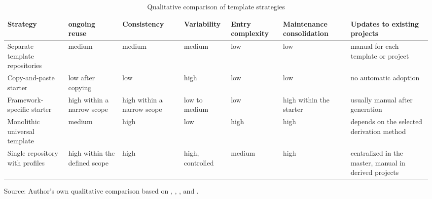 \begin{table}[htbp]
  \centering
  \scriptsize
  \setlength{\tabcolsep}{3pt}
  \renewcommand{\arraystretch}{1.08}
  \caption{Qualitative comparison of template strategies}
  \label{tab:template-strategy-comparison}
  \begin{tabularx}{\textwidth}{@{}>{\raggedright\arraybackslash}p{}>{\centering\arraybackslash}p{}>{\centering\arraybackslash}p{}>{\centering\arraybackslash}p{}>{\centering\arraybackslash}p{}>{\centering\arraybackslash}p{}>{\raggedright\arraybackslash}X@{}}
    \toprule
    \textbf{Strategy} & \textbf{ongoing reuse} &
      \textbf{Consistency} & \textbf{Variability} &
      \textbf{Entry complexity} & \textbf{Maintenance consolidation} &
      \textbf{Updates to existing projects} \\
    \midrule
    Separate template repositories & medium & medium & medium & low &
      low & manual for each template or project \\
    Copy-and-paste starter & low after copying & low & high & low &
      low & no automatic adoption \\
    Framework-specific starter & high within a narrow scope & high within a narrow scope
      & low to medium & low & high within the starter & usually manual after
      generation \\
    Monolithic universal template & medium & high & low & high & high
      & depends on the selected derivation method \\
    Single repository with profiles & high within the defined scope & high & high,
      controlled & medium & high & centralized in the master, manual in derived
      projects \\
    \bottomrule
  \end{tabularx}
  \smallskip
  {\footnotesize Source: Author's own qualitative comparison based on
  \textcite{krueger1992software-reuse},
  \textcite{clements2001software-product-lines},
  \textcite{github2026repository-template}, and \textcite{vite2026guide}.\par}
\end{table}
